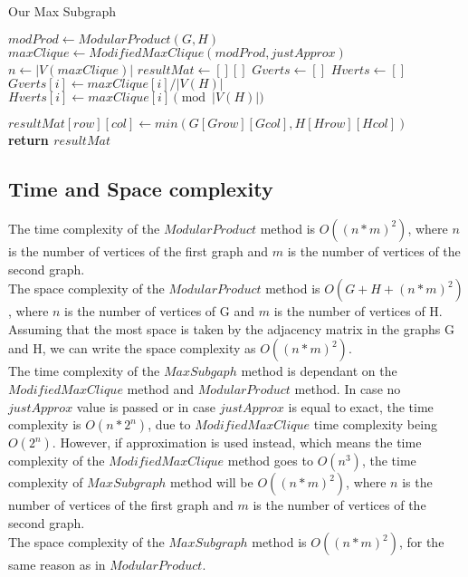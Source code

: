\begin{algorithm}
    \caption{Our Max Subgraph}\label{alg:maxsubgraph}
    \begin{algorithmic}
            \State $modProd \gets ModularProduct(G, H)$
            \State $maxClique \gets ModifiedMaxClique(modProd, justApprox)$
            \State $n \gets |V(maxClique)|$
            \State $resultMat \gets [][]$  
            \State $Gverts \gets []$ 
            \State $Hverts \gets []$ 
            \\
                \State $Gverts[i] \gets maxClique[i] / |V(H)|$
                \State $Hverts[i] \gets maxClique[i] \pmod {|V(H)|}$
            \EndFor
    
                    \State $resultMat[row][col] \gets min(G[Grow][Gcol], H[Hrow][Hcol])$
                \EndFor
            \EndFor
            \\
            \State \textbf{return $resultMat$}
            \\
        \EndProcedure
    \end{algorithmic}
\end{algorithm}

\newpage

\subsection{Time and Space complexity}
The time complexity of the $Modular Product$ method is $O((n*m)^2)$, where $n$ is the number of vertices of the first graph and $m$ is the number of vertices of the second graph. \\
The space complexity of the $Modular Product$ method is $O(G + H + (n*m)^2)$, where $n$ is the number of vertices of G and $m$ is the number of vertices of H. Assuming that the most space is taken by the adjacency matrix in the graphs G and H, we can write the space complexity as $O((n*m)^2)$.\\
The time complexity of the $Max Subgaph$ method is dependant on the $Modified Max Clique$ method and $Modular Product$ method. In case no $justApprox$ value is passed or in case $justApprox$ is equal to exact, the time complexity is $O(n*2^n)$, due to $Modified Max Clique$ time complexity being $O(2^n)$. However, if approximation is used instead, which means the time complexity of the $Modified Max Clique$ method goes to $O(n^3)$, the time complexity of $Max Subgraph$ method will be $O((n*m)^2)$, where $n$ is the number of vertices of the first graph and $m$ is the number of vertices of the second graph.\\
The space complexity of the $Max Subgraph$ method is $O((n*m)^2)$, for the same reason as in $Modular Product$.